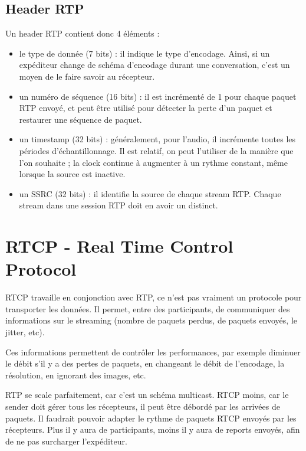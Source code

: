 			\subsection{Header RTP}
			
			Un header RTP contient donc 4 éléments :
			
			\begin{itemize}
				\item le type de donnée (7 bits) : il indique le type d'encodage. Ainsi, si un expéditeur change de schéma d'encodage durant une conversation, c'est un moyen de le faire savoir au récepteur.
				
				\item un numéro de séquence (16 bits) : il est incrémenté de 1 pour chaque paquet RTP envoyé, et peut être utilisé pour détecter la perte d'un paquet et restaurer une séquence de paquet.
				
				\item un timestamp (32 bits) : généralement, pour l'audio, il incrémente toutes les périodes d'échantillonnage.  Il est relatif, on peut l'utiliser de la manière que l'on souhaite ; la clock continue à augmenter à un rythme constant, même lorsque la source est inactive.
				
				\item un SSRC (32 bits) : il identifie la source de chaque stream RTP. Chaque stream dans une session RTP doit en avoir un distinct.
			\end{itemize}					
			
		
		\section{RTCP - Real Time Control Protocol}
		
		RTCP travaille en conjonction avec RTP, ce n'est pas vraiment un protocole pour transporter les données. Il permet, entre des participants, de communiquer des informations sur le streaming (nombre de paquets perdus, de paquets envoyés, le jitter, etc).
		
		Ces informations permettent de contrôler les performances, par exemple diminuer le débit s'il y a des pertes de paquets, en changeant le débit de l'encodage, la résolution, en ignorant des images, etc.
		
		
		RTP se scale parfaitement, car c'est un schéma multicast. RTCP moins, car le sender doit gérer tous les récepteurs, il peut être débordé par les arrivées de paquets. Il faudrait pouvoir adapter le rythme de paquets RTCP envoyés par les récepteurs. Plus il y aura de participants, moins il y aura de reports envoyés, afin de ne pas surcharger l'expéditeur.
		
